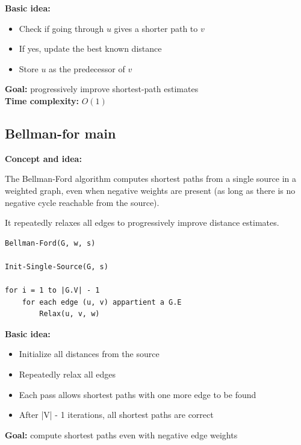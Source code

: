 \documentclass[11pt,a4paper,openany]{book}
\begin{document}
\textbf{Basic idea:}
\begin{itemize}
    \item Check if going through $u$ gives a shorter path to $v$
    \item If yes, update the best known distance
    \item Store $u$ as the predecessor of $v$
\end{itemize}

\textbf{Goal:} progressively improve shortest-path estimates \\

\textbf{Time complexity:} $O(1)$








\vspace{2cm}





\subsection{Bellman-for main}


\textbf{Concept and idea:}

The Bellman-Ford algorithm computes shortest paths from a single source in a weighted graph, even when negative weights are present (as long as there is no negative cycle reachable from the source).

It repeatedly relaxes all edges to progressively improve distance estimates.

\begin{lstlisting}
Bellman-Ford(G, w, s)

Init-Single-Source(G, s)

for i = 1 to |G.V| - 1
    for each edge (u, v) appartient a G.E
        Relax(u, v, w)
\end{lstlisting}

\textbf{Basic idea:}
\begin{itemize}
    \item Initialize all distances from the source
    \item Repeatedly relax all edges
    \item Each pass allows shortest paths with one more edge to be found
    \item After |V| - 1 iterations, all shortest paths are correct
\end{itemize}

\textbf{Goal:} compute shortest paths even with negative edge weights \\
\end{document}

